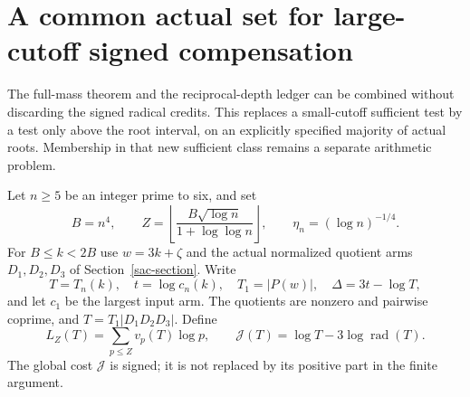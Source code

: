 \section{A common actual set for large-cutoff signed compensation}
\label{lcs-section}

The full-mass theorem and the reciprocal-depth ledger can be combined
without discarding the signed radical credits. This replaces a
small-cutoff sufficient test by a test only above the root interval,
on an explicitly specified majority of actual roots. Membership in
that new sufficient class remains a separate arithmetic problem.

Let $n\ge5$ be an integer prime to six, and set
\[
 B=n^4,\qquad
 Z=\left\lfloor\frac{B\sqrt{\log n}}{1+\log\log n}\right\rfloor,
 \qquad \eta_n=(\log n)^{-1/4}.
\]
For $B\le k<2B$ use $w=3k+\zeta$ and the actual normalized quotient
arms $D_1,D_2,D_3$ of Section~\ref{sac-section}. Write
\[
 T=T_n(k),\quad t=\log c_n(k),\quad
 T_1=|P(w)|,\quad \Delta=3t-\log T,
\]
and let $c_1$ be the largest input arm. The quotients are nonzero and
pairwise coprime, and $T=T_1|D_1D_2D_3|$. Define
\[
 L_Z(T)=\sum_{p\le Z}v_p(T)\log p,\qquad
 \mathcal J(T)=\log T-3\log\operatorname{rad}(T).
\]
The global cost $\mathcal J$ is signed; it is not replaced by its
positive part in the finite argument.

